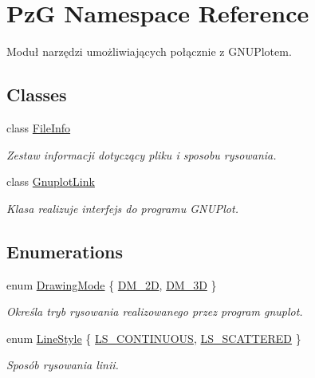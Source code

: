 \hypertarget{namespace_pz_g}{}\section{PzG Namespace Reference}
\label{namespace_pz_g}


Moduł narzędzi umożliwiających połącznie z G\+N\+U\+Plotem.  


\subsection*{Classes}
\begin{DoxyCompactItemize}
\item 
class \hyperlink{class_pz_g_1_1_file_info}{File\+Info}
\begin{DoxyCompactList}\small\item\em Zestaw informacji dotyczący pliku i sposobu rysowania. \end{DoxyCompactList}\item 
class \hyperlink{class_pz_g_1_1_gnuplot_link}{Gnuplot\+Link}
\begin{DoxyCompactList}\small\item\em Klasa realizuje interfejs do programu G\+N\+U\+Plot. \end{DoxyCompactList}\end{DoxyCompactItemize}
\subsection*{Enumerations}
\begin{DoxyCompactItemize}
\item 
enum \hyperlink{namespace_pz_g_a4360c76a1dbf714a19a0d97fe56e0660}{Drawing\+Mode} \{ \hyperlink{namespace_pz_g_a4360c76a1dbf714a19a0d97fe56e0660ac85b6f8146edb5ca2df8345dd86ef039}{D\+M\+\_\+2D}, 
\hyperlink{namespace_pz_g_a4360c76a1dbf714a19a0d97fe56e0660aa7ef207217913b87d83fdf559d8368c7}{D\+M\+\_\+3D}
 \}\begin{DoxyCompactList}\small\item\em Określa tryb rysowania realizowanego przez program {\ttfamily gnuplot}. \end{DoxyCompactList}
\item 
enum \hyperlink{namespace_pz_g_ab0580cdb6bfe9e51d7de2588bc824076}{Line\+Style} \{ \hyperlink{namespace_pz_g_ab0580cdb6bfe9e51d7de2588bc824076af8f97c84dadf8eaa1f0370861e15dfec}{L\+S\+\_\+\+C\+O\+N\+T\+I\+N\+U\+O\+US}, 
\hyperlink{namespace_pz_g_ab0580cdb6bfe9e51d7de2588bc824076a6495216b6a84a9fbe7141a687f9c03f1}{L\+S\+\_\+\+S\+C\+A\+T\+T\+E\+R\+ED}
 \}\begin{DoxyCompactList}\small\item\em Sposób rysowania linii. \end{DoxyCompactList}
\end{DoxyCompactItemize}
